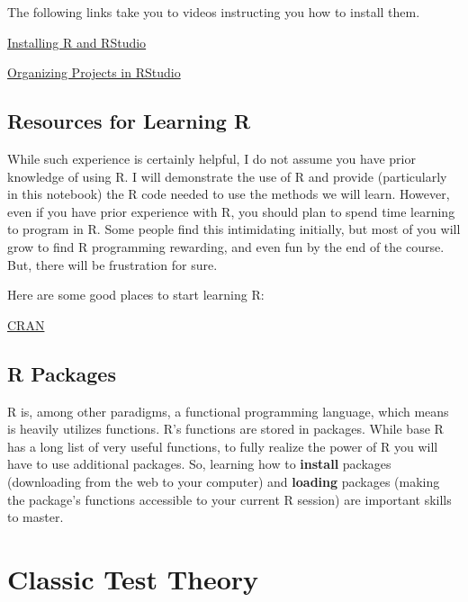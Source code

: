 \documentclass[
]{book}
\begin{document}
The following links take you to videos instructing you how to install them.

\href{https://auburn.hosted.panopto.com/Panopto/Pages/Viewer.aspx?id=5dacd1fe-b888-407b-a89f-ac150135ace8}{Installing R and RStudio}

\href{https://auburn.hosted.panopto.com/Panopto/Pages/Viewer.aspx?id=aed0e2a9-004f-453f-80c7-abbe010a063b}{Organizing Projects in RStudio}

\hypertarget{resources-for-learning-r}{%
\section*{Resources for Learning R}\label{resources-for-learning-r}}

While such experience is certainly helpful, I do not assume you have prior knowledge of using R.
I will demonstrate the use of R and provide (particularly in this notebook) the R code needed to use the methods we will learn.
However, even if you have prior experience with R, you should plan to spend time learning to program in R.
Some people find this intimidating initially, but most of you will grow to find R programming rewarding, and even fun by the end of the course.
But, there will be frustration for sure.

Here are some good places to start learning R:

\href{https://cran.r-project.org/}{CRAN}

\hypertarget{r-packages}{%
\section*{R Packages}\label{r-packages}}

R is, among other paradigms, a functional programming language, which means is heavily utilizes functions.
R's functions are stored in packages.
While base R has a long list of very useful functions, to fully realize the power of R you will have to use additional packages.
So, learning how to \textbf{install} packages (downloading from the web to your computer) and \textbf{loading} packages (making the package's functions accessible to your current R session) are important skills to master.

\hypertarget{CCT}{%
\chapter{Classic Test Theory}\label{CCT}}
\end{document}

